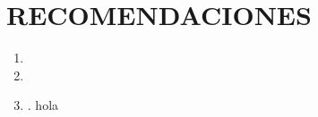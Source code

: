 \chapter[\hspace{0.2cm}RECOMENDACIONES]{RECOMENDACIONES}
\thispagestyle{empty}

\begin{enumerate}[leftmargin=1em]
    \item \lipsum[3]
    \item \lipsum[2]
    \item \lipsum[5] \parencite{Niu2020}.
    \parencite{Niu2020} \parencite[see][p10]{Niu2020} hola \textcite{Niu2020}
\end{enumerate}



